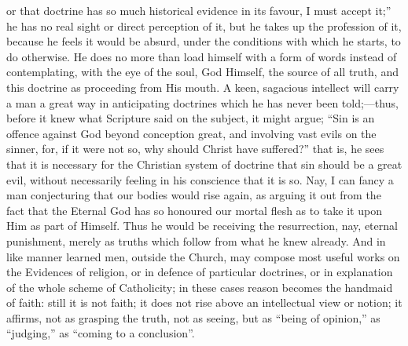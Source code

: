 or that doctrine has so much historical evidence in its favour, I must
accept it;'' he has no real sight or direct perception of it, but
he takes up the profession of it, because he feels it would be absurd,
under the conditions with which he starts, to do otherwise. He does no
more than load himself with a form of words instead of contemplating,
with the eye of the soul, God Himself, the source of all truth, and
this doctrine as proceeding from His mouth. A keen, sagacious
intellect will carry a man a great way in anticipating doctrines which
he has never been told;—thus, before it knew what Scripture said on
the subject, it might argue; ``Sin is an offence against God
beyond conception great, and involving vast evils on the sinner, for,
if it were not so, why should Christ have suffered?'' that is, he
sees that it is necessary for the Christian system of doctrine that
sin should be a great evil, without necessarily feeling in his
conscience that it is so. Nay, I can fancy a man conjecturing that our
bodies would rise again, as arguing it out from the fact that the
Eternal God has so honoured our mortal flesh as to take it upon Him as
part of Himself. Thus he would be receiving the resurrection, nay,
eternal punishment, merely as truths which follow from what he knew
already. And in like manner learned men, outside the Church, may
compose most useful works on the Evidences of religion, or in defence
of particular doctrines, or in explanation of the whole scheme of
Catholicity; in these cases reason becomes the handmaid of faith:
still it is not faith; it does not rise above an intellectual view or
notion; it affirms, not as grasping the truth, not as seeing, but as
``being of opinion,'' as ``judging,'' as ``coming
to a conclusion''.

